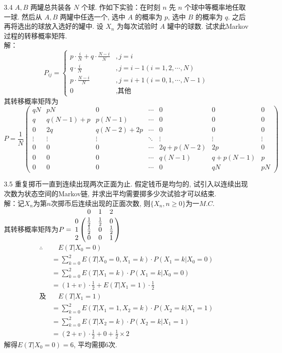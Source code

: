 3.4 $A, B$ 两罐总共装各 $N$ 个球. 作如下实验：在时刻 $n$ 先 $n$ 个球中等概率地任取一球. 然后从 $A, B$ 两罐中任选一个, 选中 $A$ 的概率为 $p$, 选中 $B$ 的概率为 $q$. 之后再将选出的球放入选好的罐中. 设 $X_n$ 为每次试验时 $A$ 罐中的球数. 试求此Markov过程的转移概率矩阵.\\
解：
\[
P_{ij} = 
\begin{cases}
p \cdot \frac{i}{N} + q \cdot \frac{N-i}{N} & , j = i\\
q \cdot \frac{i}{N} & , j = i-1(i=1,2,\cdots ,N)\\
p \cdot \frac{N-i}{N} & , j = i+1(i=0,1,\cdots ,N-1)\\
0 & , \text{其他}
\end{cases}
\]
其转移概率矩阵为
\[
P = \frac{1}{N} 
\begin{pmatrix}
qN & pN & 0 & \cdots & 0 & 0 & 0 \\
q & q(N-1)+p & p(N-1) & \cdots & 0 & 0 & 0 \\
0 & 2q & q(N-2)+2p & \cdots & 0 & 0 & 0\\
\vdots & \vdots & \vdots & \ddots & \vdots & \vdots & \vdots \\
0 & 0 & 0 & \cdots & 2q+p(N-2) & 2p & 0\\
0 & 0 & 0 & \cdots & q(N-1) & q+p(N-1) & p\\
0 & 0 & 0 & \cdots & 0 & qN & pN
\end{pmatrix}
\]


3.5 重复掷币一直到连续出现两次正面为止. 假定钱币是均匀的, 试引入以连续出现次数为状态空间的Markov链, 并求出平均需要掷多少次试验才可以结束.\\
解：记$X_n$为第$n$次掷币后连续出现的正面次数, 则$\{X_n, n \geqslant 0 \}$为一$M.C.$\\
其转移概率矩阵为$P = \bordermatrix{
				~ & 0 & 1 & 2 \cr
				0 & \frac{1}{2} & \frac{1}{2} & 0 \cr
				1 & \frac{1}{2} & 0 & \frac{1}{2} \cr
				2 & 0 & 0 & 1 
				}$\\
\[
\begin{split}
\therefore & \quad E(T | X_0 = 0)\\
		& = \sum^2_{k=0}E(T|X_0 = 0, X_1 = k)\cdot P(X_1 = k | X_0 = 0)\\
		& = \sum^2_{k=0}E(T|X_1 = k)\cdot P(X_1 = k | X_0 = 0)\\
		& = (1+v)\cdot \frac{1}{2} + E(T| X_1 = 1) \cdot \frac{1}{2}\\
\text{及}& \quad E(T | X_1 = 1)\\
		& = \sum^2_{k=0}E(T|X_1 = 1, X_2 = k)\cdot P(X_2 = k | X_1 = 1)\\
		& = \sum^2_{k=0}E(T|X_2 = k)\cdot P(X_2 = k | X_1 = 1)\\
		& = (2+v)\cdot \frac{1}{2} + 0 + \frac{1}{2} \times 2
\end{split}
\]
解得$E(T | X_0 = 0) = 6$, 平均需掷$6$次. \\


